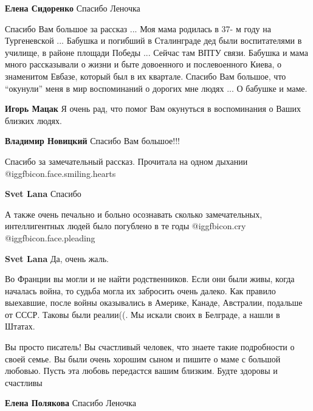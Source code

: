 \begin{itemize}
\textbf{Елена Сидоренко} Спасибо Леночка


Спасибо Вам большое за рассказ ... Моя мама родилась в 37- м году на
Тургеневской ... Бабушка и погибший в Сталинграде дед были воспитателями в
училище, в районе площади Победы ... Сейчас там ВПТУ связи. Бабушка и мама
много рассказывали о жизни и быте довоенного и послевоенного Киева, о
знаменитом Евбазе, который был в их квартале. Спасибо Вам большое, что
\enquote{окунули} меня в мир воспоминаний о дорогих мне людях ... О бабушке и маме.

\begin{itemize} %
\textbf{Игорь Мацак} Я очень рад, что помог Вам окунуться в воспоминания о Ваших близких людях.

\textbf{Владимир Новицкий} Спасибо Вам большое!!!
\end{itemize} %

Спасибо за замечательный рассказ. Прочитала на одном дыхании  @igg{fbicon.face.smiling.hearts} 

\begin{itemize} %
\textbf{Svet Lana} Спасибо


А также очень печально и больно осознавать сколько замечательных,
интеллигентных людей было погублено в те годы @igg{fbicon.cry}
@igg{fbicon.face.pleading} 

\textbf{Svet Lana} Да, очень жаль.
\end{itemize} %


Во Франции вы могли и не найти родственников. Если они были живы, когда
началась война, то судьба могла их забросить очень далеко. Как правило
выехавшие, после войны оказывались в Америке, Канаде, Австралии, подальше от
СССР. Таковы были реалии((. Мы искали своих в Белграде, а нашли в Штатах.


Вы просто писатель! Вы счастливый человек, что знаете такие подробности о своей
семье. Вы были очень хорошим сыном и пишите о маме с большой любовью. Пусть эта
любовь передастся вашим близким. Будте здоровы и счастливы

\textbf{Елена Полякова} Спасибо Леночка


\end{itemize}
